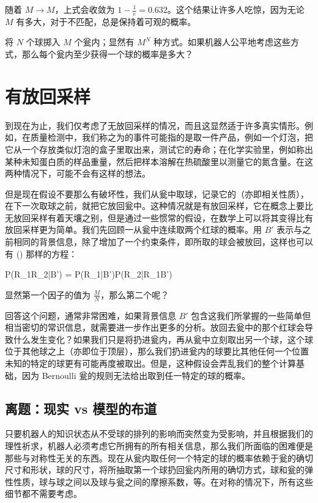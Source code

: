 随着 $M \rightarrow M$，上式会收敛为 $1 - \frac{1}{e} = 0.632$。这个结果让许多人吃惊，因为无论 $M$ 有多大，对于不匹配，总是保持着可观的概率。
\stopExercise

\startExercise
将 $N$ 个球掷入 $M$ 个瓮内；显然有 $M^N$ 种方式。如果机器人公平地考虑这些方式，那么每个瓮内至少获得一个球的概率是多大？
\stopExercise

\section{有放回采样}

到现在为止，我们仅考虑了无放回采样的情况，而且这显然适于许多真实情形。例如，在质量检测中，我们称之为的事件可能指的是取一件产品，例如一个灯泡，把它从一个存放类似灯泡的盒子里取出来，测试它的寿命；在化学实验里，例如称出某种未知蛋白质的样品重量，然后把样本溶解在热硫酸里以测量它的氮含量。在这两种情况下，可能不会有这样的想法。

但是现在假设不要那么有破坏性，我们从瓮中取球，记录它的（亦即相关性质），在下一次取球之前，就把它放回瓮中。这种情况就是有放回采样，它在概念上要比无放回采样有着天壤之别，但是通过一些惯常的假设，在数学上可以将其变得比有放回采样更为简单。我们先回顾一从瓮中连续取两个红球的概率。用 $B'$ 表示与之前相同的背景信息，除了增加了一个约束条件，即所取的球会被放回，这样也可以有 (\in[3-9]) 那样的方程：

\placeformula[3-91]
\startformula
P(R_1R_2|B') = P(R_1|B')P(R_2|R_1B')
\stopformula

显然第一个因子的值为 $\frac{M}{N}$，那么第二个呢？

回答这个问题，通常非常困难，如果背景信息 $B'$ 包含这我们所掌握的一些简单但相当密切的常识信息，就需要进一步作出更多的分析。放回去瓮中的那个红球会导致什么发生变化？如果我们只是将扔进瓮内，再从瓮中立刻取出另一个球，这个球位于其他球之上（亦即位于顶层），那么我们扔进瓮内的球要比其他任何一个位置未知的特定的球更有可能再度被取出。但是，这种假设会弄乱我们的整个计算基础，因为 Bernoulli 瓮的规则无法给出取到任一特定的球的概率。

\subsection{离题：现实 vs  模型的布道}

只要机器人的知识状态从不受球的排列的影响而突然变为受影响，并且根据我们的理性祈求，机器人必须考虑它所拥有的所有相关信息，那么我们所面临的困难便是那些与对称性无关的东西。现在从瓮内取任何一个特定的球的概率依赖于瓮的确切尺寸和形状，球的尺寸，将所抽取第一个球扔回瓮内所用的确切方式，球和瓮的弹性性质，球与球之间以及球与瓮之间的摩擦系数，等。在对称的情况下，所有这些细节都不需要考虑。

